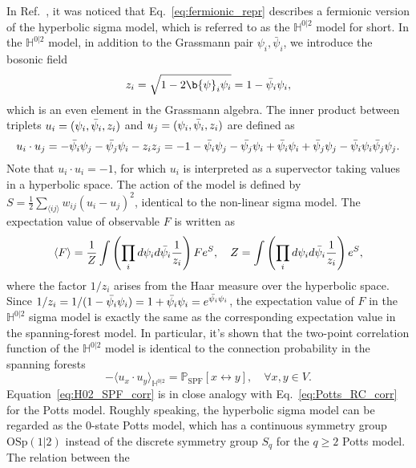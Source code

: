 In Ref.~, it was noticed that Eq.~\eqref{eq:fermionic_repr} describes a fermionic version of the hyperbolic sigma model, which 
is referred to as the $\mathbb{H}^{0|2}$ model for short. In the $\mathbb{H}^{0|2}$ model, in addition to the Grassmann pair $\psi_i, \bar{\psi}_i$, we introduce
the bosonic field
\begin{equation}
	z_i = \sqrt{1 - 2\b{\psi}_i\psi_i} = 1-\bar{\p}_i\p_i,
\end{equation}
which is an even element in the Grassmann algebra. The inner product between triplets $u_i = ({\psi}_i, \bar{{\psi}}_i, z_i)$ and 
$u_j = ({\psi}_i, \bar{{\psi}}_i, z_i)$ are defined as
\begin{equation}
	u_i \cdot u_j = -\bar{{\psi}_i}{\psi}_j - \bar{{\psi}_j}{\psi}_i - z_i z_j = -1 - \bar{{\psi}_i}{\psi}_j - \bar{{\psi}_j}{\psi}_i + \bar{{\psi}}_i{\psi}_i + \bar{{\psi}}_j{\psi}_j
	-\bar{{\psi}}_i{\psi}_i\bar{{\psi}}_j{\psi}_j.
\end{equation}
Note that $u_i \cdot u_i = -1$, for which $u_i$ is interpreted as a supervector taking values in a hyperbolic space. 
The action of the model is defined by $S = \frac{1}{2}\sum_{\langle ij \rangle} w_{ij}(u_i - u_j)^2$, identical to the non-linear sigma model.
The expectation value of observable $F$ is written as
\begin{equation}
	\langle F \rangle = \frac{1}{Z} \int \left(\prod_{i}d{\psi}_i d\bar{{\psi}}_i \frac{1}{z_i}\right) F e^S,
	\quad Z = \int \left(\prod_{i}d{\psi}_i d\bar{{\psi}}_i \frac{1}{z_i}\right) e^S,
\end{equation}
where the factor $1/z_i$ arises from the Haar measure over the hyperbolic space. Since $1/z_i = 1/(1-\bar{{\psi}_i}{\psi}_i) = 1 + \bar{{\psi}_i}{\psi}_i = e^{\bar{{\psi}_i}{\psi}_i}$,
the expectation value of $F$ in the $\mathbb{H}^{0|2}$ sigma model is exactly the same as the corresponding expectation value in the spanning-forest model.
In particular, it's shown that the two-point correlation function of the $\mathbb{H}^{0|2}$ model is identical to the connection probability 
in the spanning forests
\begin{equation}\label{eq:H02_SPF_corr}
-\langle u_x \cdot u_y \rangle_{\mathbb{H}^{0|2}} = \mathbb{P}_{\text{SPF}}[x \leftrightarrow y], \quad \forall x, y \in V.
\end{equation}
Equation~\eqref{eq:H02_SPF_corr} is in close analogy with Eq.~\eqref{eq:Potts_RC_corr} for the Potts model. Roughly speaking,
the hyperbolic sigma model can be regarded as the $0$-state Potts model, which has a continuous symmetry group $\text{OSp}(1|2)$
instead of the discrete symmetry group $S_q$ for the $q\geq2$ Potts model. The relation between the 

